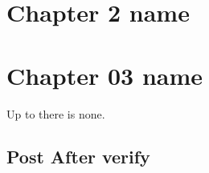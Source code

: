 \documentclass[
]{book}
\theoremstyle{definition}
\theoremstyle{definition}
\theoremstyle{definition}
\theoremstyle{definition}
\theoremstyle{remark}
\begin{document}
\hypertarget{chapter-2-name}{%
\chapter{Chapter 2 name}\label{chapter-2-name}}

\hypertarget{chapter-03-name}{%
\chapter{Chapter 03 name}\label{chapter-03-name}}

Up to there is none.

\hypertarget{post-after-verify}{%
\section{Post After verify}\label{post-after-verify}}
\end{document}
